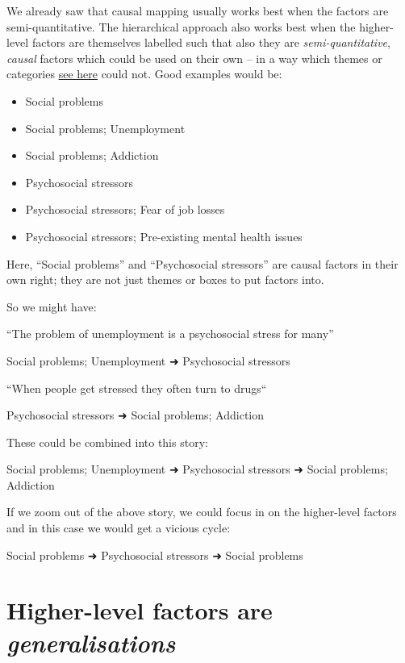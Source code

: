 \documentclass[
]{book}
\begin{document}
We already saw that causal mapping usually works best when the factors are semi-quantitative. The hierarchical approach also works best when the higher-level factors are themselves labelled such that also they are \emph{semi-quantitative}, \emph{causal} factors which could be used on their own -- in a way which themes or categories \protect\hyperlink{formulating-labels-semi-quantitative-factors}{see here} could not. Good examples would be:

\begin{itemize}
\item
  Social problems
\item
  Social problems; Unemployment
\item
  Social problems; Addiction
\item
  Psychosocial stressors
\item
  Psychosocial stressors; Fear of job losses
\item
  Psychosocial stressors; Pre-existing mental health issues
\end{itemize}

Here, ``Social problems'' and ``Psychosocial stressors'' are causal factors in their own right; they are not just themes or boxes to put factors into.

So we might have:

``The problem of unemployment is a psychosocial stress for many''

Social problems; Unemployment ➜ Psychosocial stressors

``When people get stressed they often turn to drugs``

Psychosocial stressors ➜ Social problems; Addiction

These could be combined into this story:

Social problems; Unemployment ➜ Psychosocial stressors ➜ Social problems; Addiction

If we zoom out of the above story, we could focus in on the higher-level factors and in this case we would get a vicious cycle:

Social problems ➜ Psychosocial stressors ➜ Social problems

\hypertarget{higher-level-factors-are-generalisations}{%
\section{\texorpdfstring{Higher-level factors are \emph{generalisations}}{Higher-level factors are generalisations}}\label{higher-level-factors-are-generalisations}}
\end{document}
